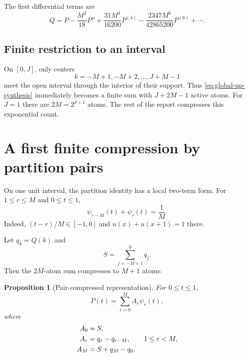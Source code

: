 \documentclass[11pt,oneside]{article}
\newtheorem{proposition}[theorem]{Proposition}
\theoremstyle{definition}
\theoremstyle{remark}
\begin{document}
The first differential terms are
\begin{equation}
 Q=P-\frac{M^2}{18}P''
 +\frac{31M^4}{16200}P^{(4)}
 -\frac{2347M^6}{42865200}P^{(6)}+\cdots.                 \label{eq:Q-first}
\end{equation}

\subsection{Finite restriction to an interval}
On $[0,J]$, only centers
\begin{equation}
 k=-M+1,-M+2,\ldots,J+M-1                                \label{eq:active-J}
\end{equation}
meet the open interval through the interior of their support.  Thus \eqref{eq:global-up-synthesis} immediately becomes a finite sum with $J+2M-1$ active atoms.  For $J=1$ there are $2M=2^{d+1}$ atoms.  The rest of the report compresses this exponential count.

\section{A first finite compression by partition pairs}

On one unit interval, the partition identity has a local two-term form.  For $1\le r\le M$ and $0\le t\le1$,
\begin{equation}
 \psi_{r-M}(t)+\psi_r(t)=\frac1M.                         \label{eq:pair-identity}
\end{equation}
Indeed, $(t-r)/M\in[-1,0]$ and $u(x)+u(x+1)=1$ there.

Let $q_k=Q(k)$ and
\begin{equation}
 S=\sum_{j=-M+1}^{0}q_j.                                  \label{eq:S-pair}
\end{equation}
Then the $2M$-atom sum compresses to $M+1$ atoms:
\begin{proposition}[Pair-compressed representation]
\label{prop:pair-compress}
For $0\le t\le1$,
\begin{equation}
 P(t)=\sum_{r=0}^{M}A_r\psi_r(t),                         \label{eq:pair-rep}
\end{equation}
where
\begin{align}
 A_0&=S,\notag\\
 A_r&=q_r-q_{r-M},\qquad 1\le r<M,                       \label{eq:pair-coeffs}\\
 A_M&=S+q_M-q_0.\notag
\end{align}
\end{proposition}
\end{document}
